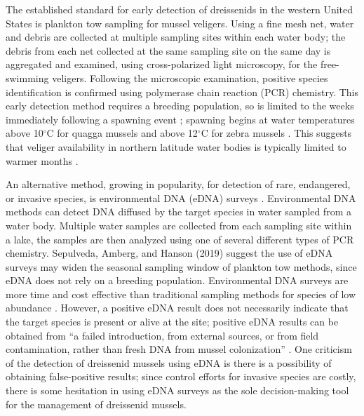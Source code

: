 \documentclass[12pt]{article}\usepackage[]{graphicx}\usepackage[]{color}
\begin{document}
The established standard for early detection of dreissenids in the western United States is plankton tow sampling for mussel veligers. Using a fine mesh net, water and debris are collected at multiple sampling sites within each water body; the debris from each net collected at the same sampling site on the same day is aggregated and examined, using cross-polarized light microscopy, for the free-swimming veligers. Following the microscopic examination, positive species identification is confirmed using polymerase chain reaction (PCR) chemistry. This early detection method requires a breeding population, so is limited to the weeks immediately following a spawning event \cite{Nichols}; spawning begins at water temperatures above 10$^\circ$C for quagga mussels and above 12$^\circ$C for zebra mussels \cite{McMahon, Mills}. This suggests that veliger availability in northern latitude water bodies is typically limited to warmer months \cite{Sepulveda:eDNA}.

An alternative method, growing in popularity, for detection of rare, endangered, or invasive species, is environmental DNA (eDNA) surveys \cite{Schmelzle}. Environmental DNA methods can detect DNA diffused by the target species in water sampled from a water body. Multiple water samples are collected from each sampling site within a lake, the samples are then analyzed using one of several different types of PCR chemistry. Sepulveda, Amberg, and Hanson (2019) suggest the use of eDNA surveys may widen the seasonal sampling window of plankton tow methods, since eDNA does not rely on a breeding population. Environmental DNA surveys are more time and cost effective than traditional sampling methods for species of low abundance \cite{Rees}. However, a positive eDNA result does not necessarily indicate that the target species is present or alive at the site; positive eDNA results can be obtained from ``a failed introduction, from external sources, or from field contamination, rather than fresh DNA from mussel colonization'' \cite{Sepulveda:eDNA}. One criticism of the detection of dreissenid mussels using eDNA is there is a possibility of obtaining false-positive results; since control efforts for invasive species are costly, there is some hesitation in using eDNA surveys as the sole decision-making tool for the management of dreissenid mussels. 
\end{document}
